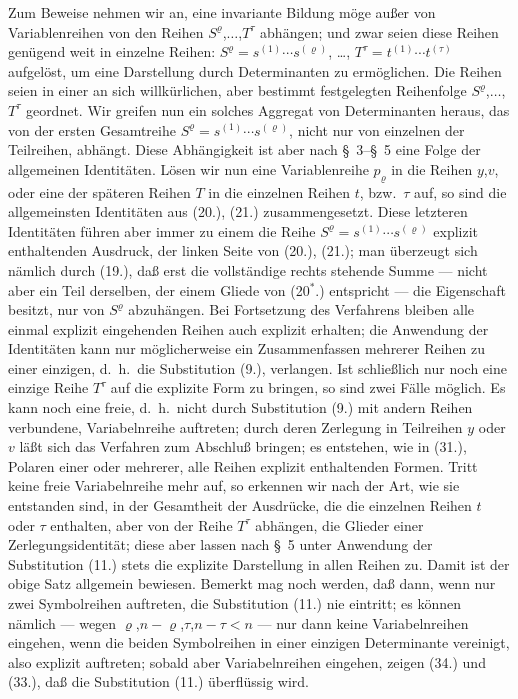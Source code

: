 \documentclass[12pt,a4paper]{article}
\begin{document}
Zum Beweise nehmen wir an, eine invariante Bildung möge außer von Variablenreihen von den Reihen $S^{\varrho}$,$\ldots$,$T^{\tau}$ abhängen; und zwar seien diese Reihen genügend weit in einzelne Reihen: $S^{\varrho} = s^{(1)} \cdots s^{(\varrho)}$, \ldots, $T^{\tau} = t^{(1)} \cdots t^{(\tau)}$ aufgelöst, um eine Darstellung durch Determinanten zu ermöglichen. Die Reihen seien in einer an sich willkürlichen, aber bestimmt festgelegten Reihenfolge $S^{\varrho}$,$\ldots$,$T^{\tau}$ geordnet. Wir greifen nun ein solches Aggregat von Determinanten heraus, das von der ersten Gesamtreihe $S^{\varrho} = s^{(1)} \cdots s^{(\varrho)}$, nicht nur von einzelnen der Teilreihen, abhängt. Diese Abhängigkeit ist aber nach \S\ 3--\S\ 5 eine Folge der allgemeinen Identitäten. Lösen wir nun eine Variablenreihe $p_{\varrho}$ in die Reihen $y$,$v$, oder eine der späteren Reihen $T$ in die einzelnen Reihen $t$, bzw.\ $\tau$ auf, so sind die allgemeinsten Identitäten aus (20.), (21.) zusammengesetzt. Diese letzteren Identitäten führen aber immer zu einem die Reihe $S^{\varrho} = s^{(1)} \cdots s^{(\varrho)}$ explizit enthaltenden Ausdruck, der linken Seite von (20.), (21.); man überzeugt sich nämlich durch (19.), daß erst die vollständige rechts stehende Summe --- nicht aber ein Teil derselben, der einem Gliede von (20$^{*}$.) entspricht --- die Eigenschaft besitzt, nur von $S^{\varrho}$ abzuhängen. Bei Fortsetzung des Verfahrens bleiben alle einmal explizit eingehenden Reihen auch explizit erhalten; die Anwendung der Identitäten kann nur möglicherweise ein Zusammenfassen mehrerer Reihen zu einer einzigen, d.\ h.\ die Substitution (9.), verlangen. Ist schließlich nur noch eine einzige Reihe $T^{\tau}$ auf die explizite Form zu bringen, so sind zwei Fälle möglich. Es kann noch eine freie, d.\ h.\ nicht durch Substitution (9.) mit andern Reihen verbundene, Variabelnreihe auftreten; durch deren Zerlegung in Teilreihen $y$ oder $v$ läßt sich das Verfahren zum Abschluß bringen; es entstehen, wie in (31.), Polaren einer oder mehrerer, alle Reihen explizit enthaltenden Formen. Tritt keine freie Variabelnreihe mehr auf, so erkennen wir nach der Art, wie sie entstanden sind, in der Gesamtheit der Ausdrücke, die die einzelnen Reihen $t$ oder $\tau$ enthalten, aber von der Reihe $T^{\tau}$ abhängen, die Glieder einer Zerlegungsidentität; diese aber lassen nach \S\ 5 unter Anwendung der Substitution (11.) stets die explizite Darstellung in allen Reihen zu. Damit ist der obige Satz allgemein bewiesen. Bemerkt mag noch werden, daß dann, wenn nur zwei Symbolreihen auftreten, die Substitution (11.) nie eintritt; es können nämlich --- wegen $\varrho$,$n-\varrho$,$\tau$,$n-\tau < n$ --- nur dann keine Variabelnreihen eingehen, wenn die beiden Symbolreihen in einer einzigen Determinante vereinigt, also explizit auftreten; sobald aber Variabelnreihen eingehen, zeigen (34.) und (33.), daß die Substitution (11.) überflüssig wird.
\end{document}
